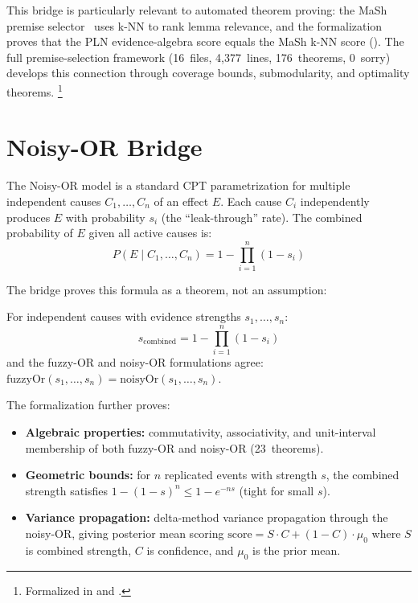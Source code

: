 \documentclass[11pt,openany]{report}
\begin{document}
\noindent
This bridge is particularly relevant to automated theorem proving:
the MaSh premise selector~\cite{Blanchette2016MaSh} uses k-NN to
rank lemma relevance, and the formalization proves that the PLN
evidence-algebra score equals the MaSh k-NN score
().  The full premise-selection framework
(16~files, 4{,}377~lines, 176~theorems, 0~sorry) develops this
connection through coverage bounds, submodularity, and optimality
theorems.%
\footnote{Formalized in  and
  .}


\section{Noisy-OR Bridge}
\label{sec:noisy-or-bridge}

The Noisy-OR model is a standard CPT parametrization for multiple
independent causes $C_1, \ldots, C_n$ of an effect $E$.  Each cause
$C_i$ independently produces $E$ with probability $s_i$ (the
``leak-through'' rate).  The combined probability of $E$ given all
active causes is:
\[
  P(E \mid C_1, \ldots, C_n) = 1 - \prod_{i=1}^{n}(1 - s_i)
\]

The bridge proves this formula as a theorem, not an assumption:

\begin{theorem}
\label{thm:noisy-or}
For independent causes with evidence strengths $s_1, \ldots, s_n$:
\[
  s_{\mathrm{combined}} = 1 - \prod_{i=1}^{n}(1 - s_i)
\]
and the fuzzy-OR and noisy-OR formulations agree:
$\mathrm{fuzzyOr}(s_1, \ldots, s_n) = \mathrm{noisyOr}(s_1, \ldots, s_n)$.
\end{theorem}

\noindent
The formalization further proves:
\begin{itemize}
\item \textbf{Algebraic properties:} commutativity, associativity,
  and unit-interval membership of both fuzzy-OR and noisy-OR
  (23~theorems).
\item \textbf{Geometric bounds:} for $n$ replicated events with
  strength $s$, the combined strength satisfies
  $1 - (1-s)^n \le 1 - e^{-ns}$ (tight for small $s$).
\item \textbf{Variance propagation:} delta-method variance
  propagation through the noisy-OR, giving posterior mean scoring
  $\mathrm{score} = S \cdot C + (1 - C) \cdot \mu_0$ where $S$ is
  combined strength, $C$ is confidence, and $\mu_0$ is the prior mean.
\end{itemize}
\end{document}
